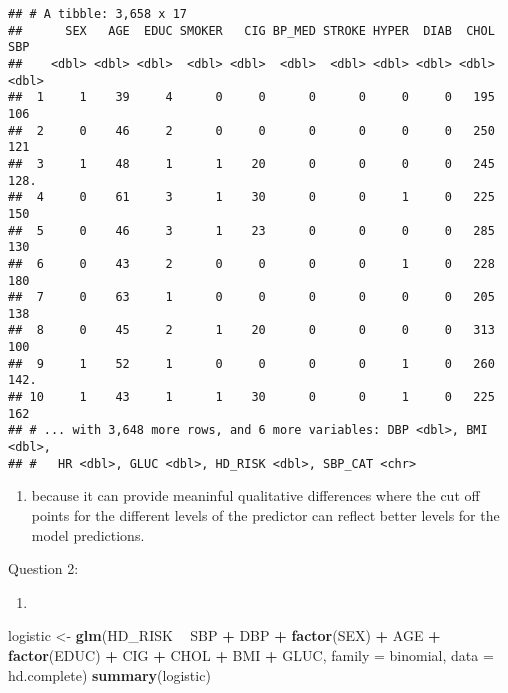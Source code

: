 \documentclass[]{article}
\newenvironment{Shaded}{\begin{snugshade}}{\end{snugshade}}
\newcommand{\DataTypeTok}[1]{\textcolor[rgb]{0.13,0.29,0.53}{#1}}
\newcommand{\KeywordTok}[1]{\textcolor[rgb]{0.13,0.29,0.53}{\textbf{#1}}}
\newcommand{\NormalTok}[1]{#1}
\newcommand{\OperatorTok}[1]{\textcolor[rgb]{0.81,0.36,0.00}{\textbf{#1}}}
\newcommand{\StringTok}[1]{\textcolor[rgb]{0.31,0.60,0.02}{#1}}
\providecommand{\tightlist}{%
  \setlength{\itemsep}{0pt}\setlength{\parskip}{0pt}}
\begin{document}
\begin{verbatim}
## # A tibble: 3,658 x 17
##      SEX   AGE  EDUC SMOKER   CIG BP_MED STROKE HYPER  DIAB  CHOL   SBP
##    <dbl> <dbl> <dbl>  <dbl> <dbl>  <dbl>  <dbl> <dbl> <dbl> <dbl> <dbl>
##  1     1    39     4      0     0      0      0     0     0   195  106 
##  2     0    46     2      0     0      0      0     0     0   250  121 
##  3     1    48     1      1    20      0      0     0     0   245  128.
##  4     0    61     3      1    30      0      0     1     0   225  150 
##  5     0    46     3      1    23      0      0     0     0   285  130 
##  6     0    43     2      0     0      0      0     1     0   228  180 
##  7     0    63     1      0     0      0      0     0     0   205  138 
##  8     0    45     2      1    20      0      0     0     0   313  100 
##  9     1    52     1      0     0      0      0     1     0   260  142.
## 10     1    43     1      1    30      0      0     1     0   225  162 
## # ... with 3,648 more rows, and 6 more variables: DBP <dbl>, BMI <dbl>,
## #   HR <dbl>, GLUC <dbl>, HD_RISK <dbl>, SBP_CAT <chr>
\end{verbatim}

\begin{enumerate}
\def\labelenumi{\alph{enumi})}
\setcounter{enumi}{3}
\tightlist
\item
  because it can provide meaninful qualitative differences where the cut
  off points for the different levels of the predictor can reflect
  better levels for the model predictions.
\end{enumerate}

Question 2:

\begin{enumerate}
\def\labelenumi{\alph{enumi})}
\item
\end{enumerate}

\begin{Shaded}
\begin{Highlighting}[]
\NormalTok{logistic <-}\StringTok{  }\KeywordTok{glm}\NormalTok{(HD_RISK }\OperatorTok{~}\StringTok{ }\NormalTok{SBP }\OperatorTok{+}\StringTok{ }\NormalTok{DBP }\OperatorTok{+}\StringTok{ }\KeywordTok{factor}\NormalTok{(SEX) }\OperatorTok{+}\StringTok{ }\NormalTok{AGE }\OperatorTok{+}\StringTok{ }\KeywordTok{factor}\NormalTok{(EDUC) }\OperatorTok{+}\StringTok{ }\NormalTok{CIG }\OperatorTok{+}\StringTok{ }\NormalTok{CHOL }\OperatorTok{+}\StringTok{ }\NormalTok{BMI }\OperatorTok{+}\StringTok{ }\NormalTok{GLUC, }\DataTypeTok{family =}\NormalTok{ binomial, }\DataTypeTok{data =}\NormalTok{ hd.complete)}
\KeywordTok{summary}\NormalTok{(logistic)}
\end{Highlighting}
\end{Shaded}
\end{document}
